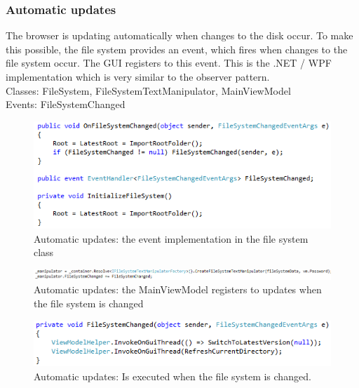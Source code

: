 \documentclass[JCDReport.tex]{subfiles}
\begin{document}
\subsubsection{Automatic updates}
The browser is updating automatically when changes to the disk occur. To make this possible, the file system provides an event, which fires when changes to the file system occur. The GUI registers to this event. This is the .NET / WPF implementation which is very similar to the observer pattern.\\
Classes: FileSystem, FileSystemTextManipulator, MainViewModel\\
Events: FileSystemChanged
\begin{figure}[h!]
	\centering
	\includegraphics[scale=1]{imageslukas/file_system_changed1.png} 
	\caption{Automatic updates: the event implementation in the file system class}
\end{figure}
\begin{figure}[h!]
	\centering
	\includegraphics[scale=1]{imageslukas/file_system_changed2.png} 
	\caption{Automatic updates: the MainViewModel registers to updates when the file system is changed}
\end{figure}
\begin{figure}[h!]
	\centering
	\includegraphics[scale=1]{imageslukas/file_system_changed3.png} 
	\caption{Automatic updates: Is executed when the file system is changed.}
\end{figure}


\end{document}

